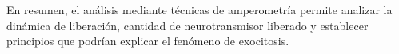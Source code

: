 \documentclass[twocolumn]{article}
\begin{document}
En resumen, el análisis mediante técnicas de amperometría permite analizar la dinámica de liberación, cantidad de neurotransmisor liberado y establecer principios que podrían explicar el fenómeno de exocitosis.















\end{document}
